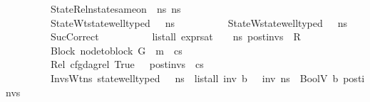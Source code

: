 \begin{isabellebody}
\ \ \ \ \ \ \ \ \ StateRel{\isacharcolon}{\kern0pt}{\isachardoublequoteopen}nstate{\isacharunderscore}{\kern0pt}same{\isacharunderscore}{\kern0pt}on\ {\isasymLambda}\ ns{}\ ns{}\ {\isacharbraceleft}{\kern0pt}{\isacharbraceright}{\kern0pt}{\isachardoublequoteclose}\ \isanewline
\ \ \ \ \ \ \ \ \ StateWt{\isacharcolon}{\kern0pt}{\isachardoublequoteopen}state{\isacharunderscore}{\kern0pt}well{\isacharunderscore}{\kern0pt}typed\ {\isasymLambda}\ {\isasymOmega}\ ns{}{\isachardoublequoteclose}\ \isanewline
\ \ \ \ \ \ \ \ \ StateW{}{\isacharcolon}{\kern0pt}{\isachardoublequoteopen}state{\isacharunderscore}{\kern0pt}well{\isacharunderscore}{\kern0pt}typed\ {\isasymLambda}\ {\isasymOmega}\ ns{}{\isachardoublequoteclose}\ \isanewline
\ \ \ \ \ \ \ \ \ SucCorrect{\isacharcolon}{\kern0pt}\isanewline
\ \ \ \ \ \ \ \ \ \ {\isachardoublequoteopen}list{\isacharunderscore}{\kern0pt}all\ {\isacharparenleft}{\kern0pt}expr{\isacharunderscore}{\kern0pt}sat\ {\isasymLambda}\ {\isasymGamma}\ {\isasymOmega}\ ns{}{\isacharparenright}{\kern0pt}\ post{\isacharunderscore}{\kern0pt}invs\ {\isasymLongrightarrow}\ R{\isachardoublequoteclose}\ \isanewline
\ \ \ \ \ \ \ \ \ Block{\isacharcolon}{\kern0pt}\ {\isachardoublequoteopen}node{\isacharunderscore}{\kern0pt}to{\isacharunderscore}{\kern0pt}block\ G\ {\isacharbang}{\kern0pt}\ m\ {\isacharequal}{\kern0pt}\ cs{\isachardoublequoteclose}\ \ \isanewline
\ \ \ \ \ \ \ \ \ Rel{\isacharcolon}{\kern0pt}\ {\isachardoublequoteopen}cfg{\isacharunderscore}{\kern0pt}dag{\isacharunderscore}{\kern0pt}rel\ True\ {\isacharbrackleft}{\kern0pt}{\isacharbrackright}{\kern0pt}\ {\isacharbrackleft}{\kern0pt}{\isacharbrackright}{\kern0pt}\ post{\isacharunderscore}{\kern0pt}invs\ {\isacharbrackleft}{\kern0pt}{\isacharbrackright}{\kern0pt}\ cs{\isachardoublequoteclose}\ \isanewline
\ \ \ \ \ \ \ \ \ InvsWt{\isacharcolon}{\kern0pt}{\isachardoublequoteopen}{\isasymAnd}ns{\isachardot}{\kern0pt}\ state{\isacharunderscore}{\kern0pt}well{\isacharunderscore}{\kern0pt}typed\ {\isasymLambda}\ {\isasymOmega}\ ns\ {\isasymLongrightarrow}\ list{\isacharunderscore}{\kern0pt}all\ {\isacharparenleft}{\kern0pt}{\isasymlambda}inv{\isachardot}{\kern0pt}\ {\isasymexists}b{\isachardot}{\kern0pt}\ {\isasymLambda}{\isacharcomma}{\kern0pt}{\isasymGamma}{\isacharcomma}{\kern0pt}{\isasymOmega}\ {\isasymturnstile}\ {\isasymlangle}inv{\isacharcomma}{\kern0pt}\ ns{\isasymrangle}\ {\isasymDown}\ BoolV\ b{\isacharparenright}{\kern0pt}\ post{\isacharunderscore}{\kern0pt}invs{\isachardoublequoteclose}\isanewline

\end{isabellebody}
